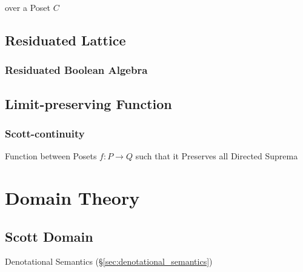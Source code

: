 over a Poset $C$



\subsection{Residuated Lattice}\label{sec:residuated_lattice}

\subsubsection{Residuated Boolean Algebra}
\label{sec:residuated_boolean_algebra}



\subsection{Limit-preserving Function}\label{sec:limit_preserving}

\subsubsection{Scott-continuity}\label{sec:scott_continuity}

Function between Posets $f : P \rightarrow Q$ such that it Preserves
all Directed Suprema %



\section{Domain Theory}\label{sec:domain_theory}

\subsection{Scott Domain}\label{sec:scott_domain}

Denotational Semantics (\S\ref{sec:denotational_semantics})

